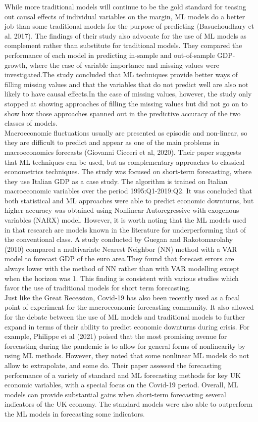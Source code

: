 \documentclass[12pt,italian, twoside]{report}
\begin{document}
While more traditional models will continue to be the gold standard for teasing out causal effects of individual variables on the margin, ML models do a better job than some traditional models for the purpose of predicting (Basuchoudhary et al. 2017). The findings of their study also advocate for the use of ML models as complement rather than substitute for traditional models. They compared the performance of each model in predicting in-sample and out-of-sample GDP-growth, where the case of variable importance and missing values were investigated.The study concluded that ML techniques provide better ways of filling missing values and that the variables that do not predict well are also not likely to have causal effects.In the case of missing values, however, the study only stopped at showing approaches of filling the missing values but did not go on to show how those approaches spanned out in the predictive accuracy of the two classes of models.\\
Macroeconomic fluctuations usually are presented as episodic and non-linear, so they are difficult to predict and appear as one of the main problems in macroeconomics forecasts (Giovanni Cicceri et al, 2020). Their paper suggests that ML techniques can be used, but as complementary approaches to classical econometrics techniques. The study was focused on short-term forecasting, where they use Italian GDP as a case study. The algorithm is trained on Italian macroeconomic variables over the period 1995:Q1-2019:Q2. It was concluded that both statistical and ML approaches were able to predict economic downturns, but higher accuracy was obtained using Nonlinear Autoregressive with exogenous variables (NARX) model. However, it is worth noting that the ML models used in that research are models known in the literature for underperforming that of the conventional class. A study conducted by Guegan and Rakotomarolahy (2010) compared a multivariate Nearest Neighbor (NN) method with a VAR model to forecast GDP of the euro area.They found that forecast errors are always lower with the method of NN rather than with VAR modelling except when the horizon was 1. This finding is consistent with various studies which favor the use of traditional models for short term forecasting.
\\
Just like the Great Recession, Covid-19 has also been recently used as a focal point of experiment for the macroeconomic forecasting community. It also allowed for the debate between the use of ML models and traditional models to further expand in terms of their ability to predict economic downturns during crisis. For example, Philippe et al (2021) poised that the most promising avenue for forecasting during the pandemic is to allow for general forms of nonlinearity by using ML methods. However, they noted that some nonlinear ML models do not allow to extrapolate, and some do. Their paper assessed the forecasting performance of a variety of standard and ML forecasting methods for key UK economic variables, with a special focus on the Covid-19 period. Overall, ML models can provide substantial gains when short-term forecasting several indicators of the UK economy. The standard models were also able to outperform the ML models in forecasting some indicators.
\end{document}
